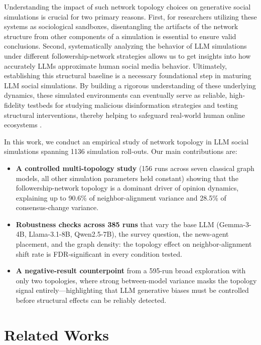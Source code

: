 \documentclass[11pt]{article}
\begin{document}
Understanding the impact of such network topology choices on generative social simulations is crucial for two primary reasons. First, for researchers utilizing these systems as sociological sandboxes, disentangling the artifacts of the network structure from other components of a simulation is essential to ensure valid conclusions. Second, systematically analyzing the behavior of LLM simulations under different followership-network strategies allows us to get insights into how accurately LLMs approximate human social media behavior. Ultimately, establishing this structural baseline is a necessary foundational step in maturing LLM social simulations. By building a rigorous understanding of these underlying dynamics, these simulated environments can eventually serve as reliable, high-fidelity testbeds for studying malicious disinformation strategies and testing structural interventions, thereby helping to safeguard real-world human online ecosystems \cite{touzel2024simulationsolvingsocietalscalemanipulation}.

In this work, we conduct an empirical study of network topology in LLM social simulations spanning 1136 simulation roll-outs. Our main contributions are:

\begin{itemize}
    \item \textbf{A controlled multi-topology study} (156 runs across seven classical graph models, all other simulation parameters held constant) showing that the followership-network topology is a dominant driver of opinion dynamics, explaining up to 90.6\% of neighbor-alignment variance and 28.5\% of consensus-change variance.
    \item \textbf{Robustness checks across 385 runs} that vary the base LLM (Gemma-3-4B, Llama-3.1-8B, Qwen2.5-7B), the survey question, the news-agent placement, and the graph density: the topology effect on neighbor-alignment shift rate is FDR-significant in every condition tested.
    \item \textbf{A negative-result counterpoint} from a 595-run broad exploration with only two topologies, where strong between-model variance masks the topology signal entirely---highlighting that LLM generative biases must be controlled before structural effects can be reliably detected.
\end{itemize}

\section{Related Works}
\end{document}
